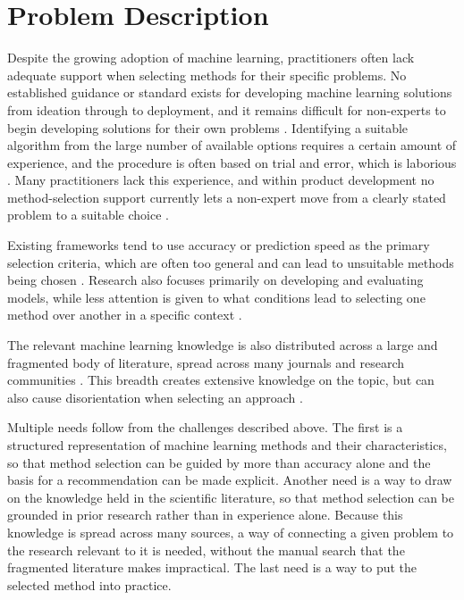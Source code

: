 \section{Problem Description}
\label{sec:problem-description}

Despite the growing adoption of machine learning, practitioners
often lack adequate support when selecting methods for their
specific problems. No established guidance or standard exists 
for developing machine learning solutions from ideation 
through to deployment, and it remains difficult for non-experts to begin
developing solutions for their own problems
\parencite{chen2023ml_manufacturing_industry4}.
Identifying a suitable algorithm from the large number of
available options requires a certain amount of experience, and
the procedure is often based on trial and error, which is
laborious \parencite{lickert2021_ml_selection_reverse_logistics}.
Many practitioners lack this experience, and within product 
development no method-selection support currently lets a 
non-expert move from a clearly stated problem to a suitable 
choice
\parencite{sonntag2023pattern_ml_product_development}.

Existing frameworks tend to use accuracy or prediction speed as
the primary selection criteria, which are often too general and
can lead to unsuitable methods being chosen
\parencite{sala2018selecting_ml_algorithm}.
Research also focuses primarily on developing and evaluating
models, while less attention is given to what conditions lead to
selecting one method over another in a specific context
\parencite{arena2024conceptual_framework_ml_algorithm_selection_predictive_maintenance}.

The relevant machine learning knowledge is also distributed across a large and
fragmented body of literature, spread across many journals and
research communities \parencite{adekoya2022applications_ai_em}.
This breadth creates extensive knowledge on the topic, but can
also cause disorientation when selecting an approach
\parencite{sala2018selecting_ml_algorithm}.

Multiple needs follow from the challenges described above.
The first is a structured representation of machine learning
methods and their characteristics, so that method selection can
be guided by more than accuracy alone and the basis for a
recommendation can be made explicit.
Another need is a way to draw on the knowledge held in the
scientific literature, so that method selection can be grounded in
prior research rather than in experience alone. Because this
knowledge is spread across many sources, a way of connecting a
given problem to the research relevant to it is needed, without
the manual search that the fragmented literature makes
impractical. The last need is a way to put the selected method into practice.

